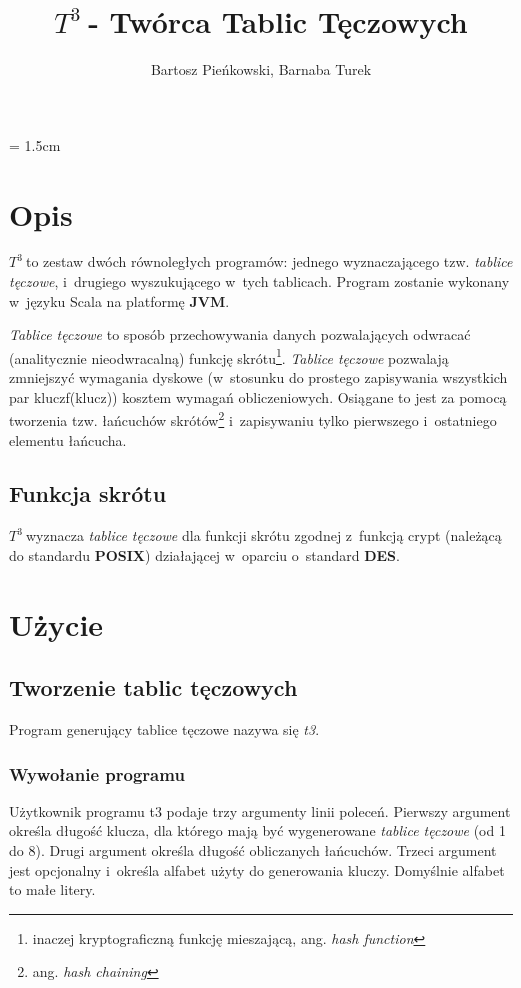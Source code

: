 \documentclass{article}
\begin{document}
\sloppy
\pagestyle{fancy}
\lhead{\rightmark}
\rhead{\leftmark}
\cfoot{\thepage}
\headsep = 1.5cm
\renewcommand{\headrulewidth}{0.4pt}
\renewcommand{\footrulewidth}{0.4pt}
\newcommand{\ttt}{$T^3\:$}

\title{\ttt - Twórca Tablic Tęczowych}
\author{Bartosz Pieńkowski, Barnaba Turek}
\maketitle
\section{Opis}
\ttt to zestaw dwóch równoległych programów: jednego wyznaczającego tzw. \emph{tablice tęczowe}, i~drugiego wyszukującego w~tych tablicach.
Program zostanie wykonany w~języku Scala na platformę \textbf{JVM}.

\emph{Tablice tęczowe} to sposób przechowywania danych pozwalających odwracać (analitycznie nieodwracalną) funkcję skrótu\footnote{inaczej kryptograficzną funkcję mieszającą, ang. \emph{hash function}}.
\emph{Tablice tęczowe} pozwalają zmniejszyć wymagania dyskowe (w~stosunku do prostego zapisywania wszystkich par klucz\dywiz f(klucz)) kosztem wymagań obliczeniowych.
Osiągane to jest za pomocą tworzenia tzw. łańcuchów skrótów\footnote{ang. \emph{hash chaining}} i~zapisywaniu tylko pierwszego i~ostatniego elementu łańcucha.

\subsection{Funkcja skrótu}
\ttt wyznacza \emph{tablice tęczowe} dla funkcji skrótu zgodnej z~funkcją crypt (należącą do standardu \textbf{POSIX}) działającej w~oparciu o~standard \textbf{DES}.

\section{Użycie}
\subsection{Tworzenie tablic tęczowych}
Program generujący tablice tęczowe nazywa się \emph{t3}.

\subsubsection{Wywołanie programu}
Użytkownik programu t3 podaje trzy argumenty linii poleceń. Pierwszy argument określa długość klucza, dla którego mają być wygenerowane \emph{tablice tęczowe} (od 1 do 8).
Drugi argument określa długość obliczanych łańcuchów.
Trzeci argument jest opcjonalny i~określa alfabet użyty do generowania kluczy. Domyślnie alfabet to małe litery.
\end{document}
